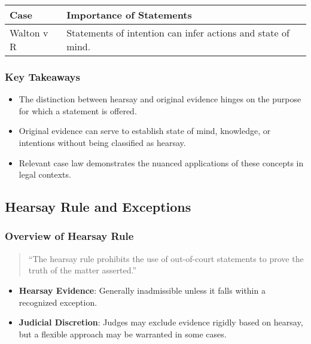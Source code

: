 \begin{longtable}[]{@{}
  >{\raggedright\arraybackslash}p{}
  >{\raggedright\arraybackslash}p{}@{}}
\toprule\noalign{}
\begin{minipage}[b]{\linewidth}\raggedright
Case
\end{minipage} & \begin{minipage}[b]{\linewidth}\raggedright
Importance of Statements
\end{minipage} \\
\midrule\noalign{}
\endhead
\bottomrule\noalign{}
\endlastfoot
Walton v R & Statements of intention can infer actions and state of
mind. \\
\end{longtable}

\subsubsection{Key Takeaways}\label{key-takeaways}

\begin{itemize}
\tightlist
\item
  The distinction between hearsay and original evidence hinges on the
  purpose for which a statement is offered.
\item
  Original evidence can serve to establish state of mind, knowledge, or
  intentions without being classified as hearsay.
\item
  Relevant case law demonstrates the nuanced applications of these
  concepts in legal contexts.
\end{itemize}

\subsection{  Hearsay Rule and
Exceptions}\label{hearsay-rule-and-exceptions}

\subsubsection{Overview of Hearsay Rule}\label{overview-of-hearsay-rule}

\begin{quote}
``The hearsay rule prohibits the use of out-of-court statements to prove
the truth of the matter asserted.''
\end{quote}

\begin{itemize}
\tightlist
\item
  \textbf{Hearsay Evidence}: Generally inadmissible unless it falls
  within a recognized exception.
\item
  \textbf{Judicial Discretion}: Judges may exclude evidence rigidly
  based on hearsay, but a flexible approach may be warranted in some
  cases.
\end{itemize}

